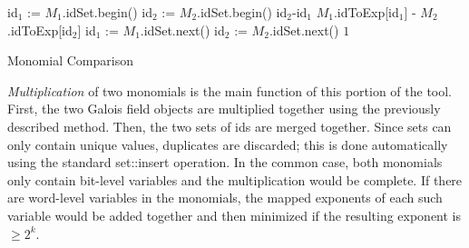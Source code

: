 \begin{algorithm}[hbt]
\SetAlgoNoLine

    id$_1$ := $M_1$.idSet.begin()\;
    id$_2$ := $M_2$.idSet.begin()\;
    {
        {
            \Return id$_2$-id$_1$\;
        }
        {
            {
                \Return $M_1$.idToExp[id$_1$] - $M_2$.idToExp[id$_2$]\;
            }
        }
        id$_1$ := $M_1$.idSet.next()\;
        id$_2$ := $M_2$.idSet.next()\;
    }
    \Return $1$\;
\caption{Monomial Comparison}\label{alg:monComp}

\end{algorithm}

{\it Multiplication} of two monomials is the main function of this portion of
the tool. First, the two Galois field objects are multiplied together using the previously described
method. Then, the two sets of ids are merged together. Since sets can only 
contain unique values, duplicates are discarded; this is done automatically using
the standard set::insert operation. 
In the common case, both 
monomials only contain bit-level variables and the multiplication would be
complete. If there are word-level variables in the monomials, the mapped 
exponents of each such variable would be added together and then minimized if the
resulting exponent is $\geq2^k$.

